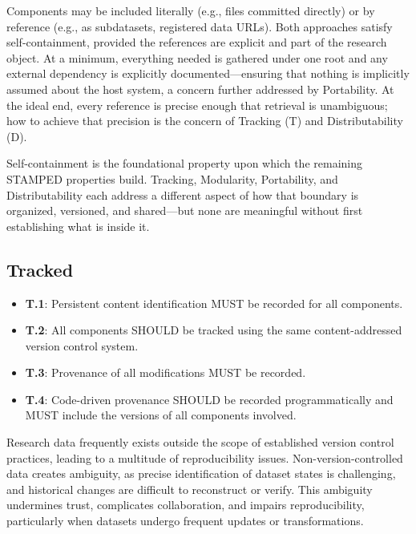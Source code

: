 \documentclass{article}
\begin{document}
Components may be included literally (e.g., files committed directly) or by reference (e.g., as subdatasets, registered data URLs).
Both approaches satisfy self-containment, provided the references are explicit and part of the research object.
At a minimum, everything needed is gathered under one root and any external dependency is explicitly documented---ensuring that nothing is implicitly assumed about the host system, a concern further addressed by Portability.
At the ideal end, every reference is precise enough that retrieval is unambiguous; how to achieve that precision is the concern of Tracking (T) and Distributability (D).

Self-containment is the foundational property upon which the remaining STAMPED properties build.
Tracking, Modularity, Portability, and Distributability each address a different aspect of how that boundary is organized, versioned, and shared---but none are meaningful without first establishing what is inside it.



\subsection{Tracked}

\begin{itemize}
    \item \textbf{T.1}: Persistent content identification MUST be recorded for all components.
    \item \textbf{T.2}: All components SHOULD be tracked using the same content-addressed version control system.
    \item \textbf{T.3}: Provenance of all modifications MUST be recorded.
    \item \textbf{T.4}: Code-driven provenance SHOULD be recorded programmatically and MUST include the versions of
    all components involved.
\end{itemize}

Research data frequently exists outside the scope of established version control practices, leading to a multitude of reproducibility issues.
Non-version-controlled data creates ambiguity, as precise identification of dataset states is challenging, and historical changes are difficult to reconstruct or verify.
This ambiguity undermines trust, complicates collaboration, and impairs reproducibility, particularly when datasets undergo frequent updates or transformations.
\end{document}
